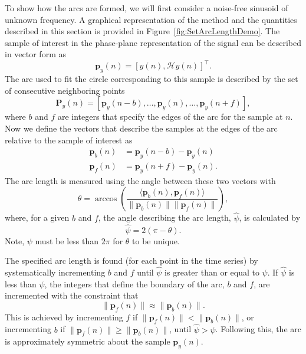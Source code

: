 \documentclass[a4paper]{IEEEtran}
\begin{document}
To show how the arcs are formed, we will first consider a noise-free sinusoid of unknown frequency. A graphical representation of the method and the quantities described in this section is provided in Figure~\ref{fig:SetArcLengthDemo}. The sample of interest in the phase-plane representation of the signal can be described in vector form as
\begin{equation}
	\mathbf{p}_y(n) = \left[y\left(n\right),\mathcal{H}y\left(n\right)\right]^{\top}.
\end{equation}
The arc used to fit the circle corresponding to this sample is described by the set of consecutive neighboring points
\begin{equation}
	\mathbf{P}_y(n) = \left[\mathbf{p}_y(n-b),\hdots,\mathbf{p}_y(n),\hdots,\mathbf{p}_y(n+f)\right],
\end{equation}
where $b$ and $f$ are integers that specify the edges of the arc for the sample at $n$. Now we define the vectors that describe the samples at the edges of the arc relative to the sample of interest as
\begin{align}
	\mathbf{p}_b(n) &= \mathbf{p}_y(n-b)-\mathbf{p}_y(n) \\
	\mathbf{p}_f(n) &= \mathbf{p}_y(n+f)-\mathbf{p}_y(n).
\end{align}
The arc length is measured using the angle between these two vectors with
\begin{equation}
	\theta = \arccos\left(\frac{\langle\mathbf{p}_b(n),\mathbf{p}_f(n)\rangle}{\|\mathbf{p}_b(n)\| \|\mathbf{p}_f(n)\|}\right),
\end{equation}
where, for a given $b$ and $f$, the angle describing the arc length, $\hat\psi$, is calculated by
\begin{equation}\label{eq:theta_2_psi}
	\hat\psi = 2(\pi-\theta).
\end{equation}
Note, $\psi$ must be less than $2\pi$ for $\theta$ to be unique.

The specified arc length is found (for each point in the time series) by systematically incrementing $b$ and $f$ until $\hat\psi$ is greater than or equal to $\psi$. If $\hat\psi$ is less than $\psi$, the integers that define the boundary of the arc, $b$ and $f$, are incremented with the constraint that
\begin{equation}\label{eq:balanced_distances}
	\|\mathbf{p}_f(n)\| \approx \|\mathbf{p}_b(n)\|.
\end{equation}
This is achieved by incrementing $f$ if $\|\mathbf{p}_f(n)\| < \|\mathbf{p}_b(n)\|$, or incrementing $b$ if $\|\mathbf{p}_f(n)\| \ge \|\mathbf{p}_b(n)\|$, until $\hat\psi > \psi$. Following this, the arc is approximately symmetric about the sample $\mathbf{p}_y(n)$. 
\end{document}
